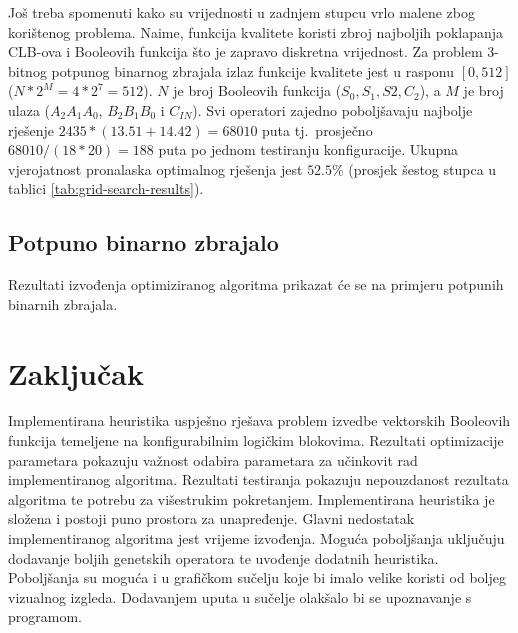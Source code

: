 \documentclass[times, utf8, diplomski]{fer}
\begin{document}
Još treba spomenuti kako su vrijednosti u zadnjem stupcu vrlo malene zbog korištenog problema. Naime, funkcija kvalitete koristi zbroj najboljih poklapanja CLB-ova i Booleovih funkcija što je zapravo diskretna vrijednost. Za problem $3$-bitnog potpunog binarnog zbrajala izlaz funkcije kvalitete jest u rasponu $[0, 512]$ ($N*2^{M}=4*2^{7}=512$). $N$ je broj Booleovih funkcija ($S_{0}, S_{1}, S{2}, C_{2}$), a $M$ je broj ulaza ($A_{2}A_{1}A_{0}$, $B_{2}B_{1}B_{0}$ i $C_{IN}$). Svi operatori zajedno poboljšavaju najbolje rješenje $2435*(13.51+14.42)=68010$ puta tj.~prosječno $68010/(18*20)=188$ puta po jednom testiranju konfiguracije. Ukupna vjerojatnost pronalaska optimalnog rješenja jest $52.5\%$ (prosjek šestog stupca u tablici \ref{tab:grid-search-results}).


\section{Potpuno binarno zbrajalo}

Rezultati izvođenja optimiziranog algoritma prikazat će se na primjeru potpunih binarnih zbrajala.


\chapter{Zaključak} \label{chapter:conclusion}

Implementirana heuristika uspješno rješava problem izvedbe vektorskih Booleovih funkcija temeljene na konfigurabilnim logičkim blokovima. Rezultati optimizacije parametara pokazuju važnost odabira parametara za učinkovit rad implementiranog algoritma. Rezultati testiranja pokazuju nepouzdanost rezultata algoritma te potrebu za višestrukim pokretanjem. Implementirana heuristika je složena i postoji puno prostora za unapređenje. Glavni nedostatak implementiranog algoritma jest vrijeme izvođenja. Moguća poboljšanja uključuju dodavanje boljih genetskih operatora te uvođenje dodatnih heuristika. Poboljšanja su moguća i u grafičkom sučelju koje bi imalo velike koristi od boljeg vizualnog izgleda. Dodavanjem uputa u sučelje olakšalo bi se upoznavanje s programom.



\end{document}
